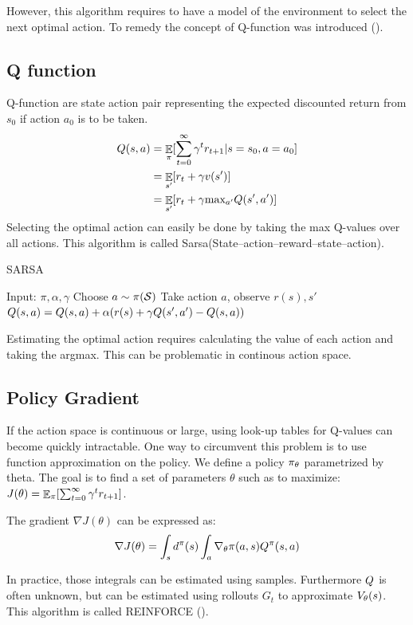 However, this algorithm requires to have a model of the environment to select the next optimal action. To remedy the concept of Q-function was introduced (\cite{watkins1992q}).

\subsection{Q function}
Q-function are state action pair representing the expected discounted return from $s_0$ if action $a_0$ is to be taken.
\begin{equation}
\begin{split}
    Q(s,a) &= \mathop{\mathbb{E}}_{\pi}[\sum_{t=0}^{\infty} \gamma^t r_{t+1} | s = s_0,a = a_0] \\ 
    &= \mathop{\mathbb{E}}_{s'}[r_t + \gamma v(s')]\\
    &= \mathop{\mathbb{E}}_{s'}[r_t + \gamma \text{max}_{a'} Q(s',a')]
\end{split}
\end{equation}
Selecting the optimal action can easily be done by taking the max Q-values over all actions. This algorithm is called Sarsa(State–action–reward–state–action).\\
\begin{algorithm}[H]
\caption{SARSA}
\begin{algorithmic}[1]
    \STATE Input: $\pi,\alpha,\gamma$
        \STATE Choose $a \sim \pi(\mathcal{S})$
        \STATE Take action $a$, observe $r(s),s'$
        \STATE $Q(s,a) = Q(s,a) + \alpha(  r(s) + \gamma Q(s',a') - Q(s,a)) $
    \ENDFOR
\end{algorithmic}
\label{alg:SARSA}
\end{algorithm}


Estimating the optimal action requires calculating the value of each action and taking the argmax. This can be problematic in continous action space.


\subsection{Policy Gradient}
If the action space is continuous or large, using look-up tables for Q-values can become quickly intractable. One way to circumvent this problem is to use function approximation on the policy. We define a policy $\pi_{\theta}$ parametrized by theta. The goal is to find a set of parameters $\theta$ such as to maximize: $J(\theta)=\mathop{\mathbb{E}}_{\pi}[\sum_{t=0}^{\infty} \gamma^t r_{t+1}]$. 
\begin{definition}
The gradient $\nabla J(\theta)$ can be expressed as:
\begin{equation}
    \nabla J(\theta) = \int_s d^{\pi}(s) \int_a \nabla_{\theta} \pi(a,s)Q^{\pi}(s,a)
\end{equation}
\end{definition}
In practice, those integrals can be estimated using samples. Furthermore $Q$ is often unknown, but can be estimated using rollouts $G_t$ to approximate $V_{\theta}(s)$. This algorithm is called REINFORCE (\cite{williams1995gradient}).

